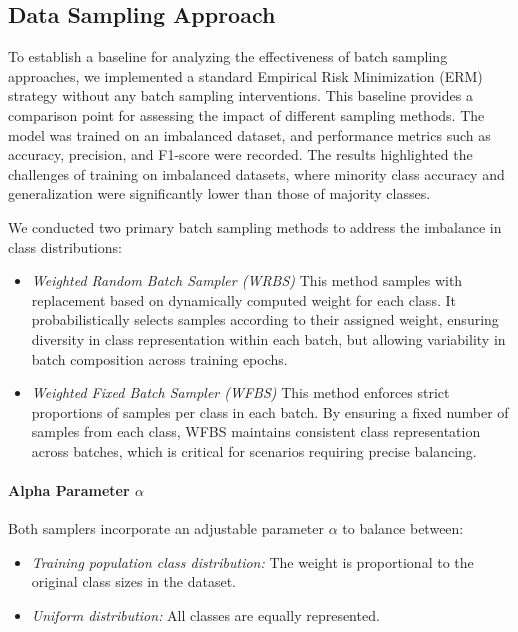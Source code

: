 

\subsection{Data Sampling Approach}

To establish a baseline for analyzing the effectiveness of batch sampling approaches, we implemented a standard Empirical Risk Minimization (ERM) strategy without any batch sampling interventions. This baseline provides a comparison point for assessing the impact of different sampling methods. The model was trained on an imbalanced dataset, and performance metrics such as accuracy, precision, and F1-score were recorded. The results highlighted the challenges of training on imbalanced datasets, where minority class accuracy and generalization were significantly lower than those of majority classes.

We conducted two primary batch sampling methods to address the imbalance in class distributions:

\begin{itemize}
    \item \textit{Weighted Random Batch Sampler (WRBS)} This method samples with replacement based on dynamically computed weight for each class. It probabilistically selects samples according to their assigned weight, ensuring diversity in class representation within each batch, but allowing variability in batch composition across training epochs.

    \item \textit{Weighted Fixed Batch Sampler (WFBS)} This method enforces strict proportions of samples per class in each batch. By ensuring a fixed number of samples from each class, WFBS maintains consistent class representation across batches, which is critical for scenarios requiring precise balancing.
\end{itemize}

\paragraph{Alpha Parameter $\alpha$} Both samplers incorporate an adjustable parameter $\alpha$ to balance between:
\begin{itemize}
    \item \textit{Training population class distribution:} The weight is proportional to the original class sizes in the dataset.
    \item \textit{Uniform distribution:} All classes are equally represented.
\end{itemize}

